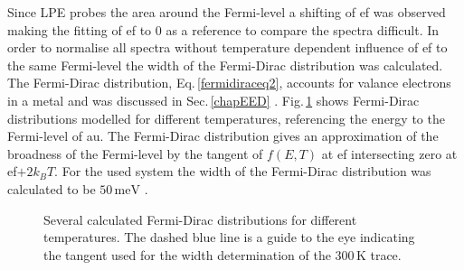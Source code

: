 \documentclass[a4paper,12pt,twoside]{article}
\begin{document}
Since \gls{LPE} probes the area around the Fermi-level a shifting of \gls{ef} was observed making the fitting of \gls{ef} to 0 as a reference to compare the spectra difficult. In order to normalise all spectra without temperature dependent influence of \gls{ef} to the same Fermi-level the width of the Fermi-Dirac distribution was calculated.
The Fermi-Dirac distribution, Eq.\,\ref{fermidiraceq2}, accounts for valance electrons in a metal and was discussed in Sec.\,\ref{chapEED} \cite{H.Ibach2008}.
Fig.\,\ref{fermi1} shows Fermi-Dirac distributions modelled for different temperatures, referencing the energy to the Fermi-level of \gls{au}. The Fermi-Dirac distribution gives an approximation of the broadness of the Fermi-level by the tangent of $f(E,T)$ at \gls{ef} intersecting zero at \gls{ef}$+2k_{B}T$. For the used system the width of the Fermi-Dirac distribution was calculated to be $50\,\mathrm{\mbox{meV}}$ \cite{H.Ibach2008}.
    \begin{figure}[H]
		\caption{Several calculated Fermi-Dirac distributions for different temperatures. The dashed blue line is a guide to the eye indicating the tangent used for the width determination of the $300\,\mathrm{K}$ trace.}
	    	\label{fermi1}
	\end{figure}
\end{document}
